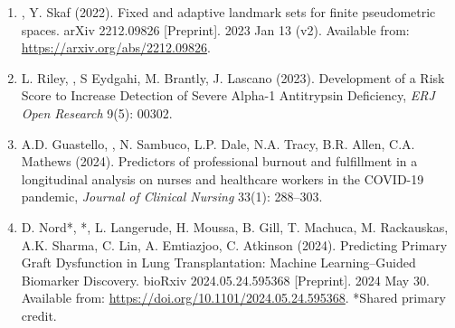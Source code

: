 \documentclass{nihbiosketch}
\begin{document}
\begin{enumerate}
\begin{enumerate}
\item {}, Y. Skaf (2022). Fixed and adaptive landmark sets for finite pseudometric spaces. arXiv 2212.09826 [Preprint]. 2023 Jan 13 (v2).  Available from: \url{https://arxiv.org/abs/2212.09826}.
\item L. Riley, , S Eydgahi, M. Brantly, J. Lascano (2023). Development of a Risk Score to Increase Detection of Severe Alpha-1 Antitrypsin Deficiency, \emph{ERJ Open Research} 9(5): 00302.
\item A.D. Guastello, , N. Sambuco, L.P. Dale, N.A. Tracy, B.R. Allen, C.A. Mathews (2024). Predictors of professional burnout and fulfillment in a longitudinal analysis on nurses and healthcare workers in the COVID-19 pandemic, \emph{Journal of Clinical Nursing} 33(1): 288--303.
\item D. Nord*, *, L. Langerude, H. Moussa, B. Gill, T. Machuca, M. Rackauskas, A.K. Sharma, C. Lin, A. Emtiazjoo, C. Atkinson (2024). Predicting Primary Graft Dysfunction in Lung Transplantation: Machine Learning--Guided Biomarker Discovery. bioRxiv 2024.05.24.595368 [Preprint]. 2024 May 30. Available from: \url{https://doi.org/10.1101/2024.05.24.595368}. *{\small Shared primary credit.}
\end{enumerate}


\end{enumerate}
\end{document}
